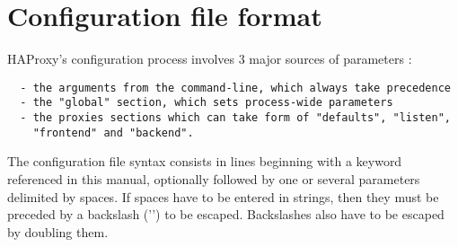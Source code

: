 
\section{Configuration file format}

HAProxy's configuration process involves 3 major sources of parameters :

\begin{verbatim}
  - the arguments from the command-line, which always take precedence
  - the "global" section, which sets process-wide parameters
  - the proxies sections which can take form of "defaults", "listen",
    "frontend" and "backend".
\end{verbatim}


The configuration file syntax consists in lines beginning with a keyword
referenced in this manual, optionally followed by one or several parameters
delimited by spaces. If spaces have to be entered in strings, then they must be
preceded by a backslash ('\bslash ') to be escaped. Backslashes also have to be
escaped by doubling them.

